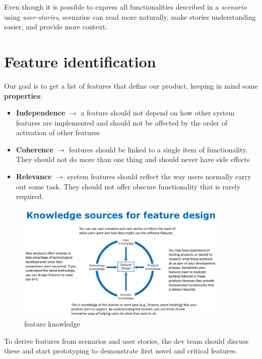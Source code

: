 Even though it is possible to express all functionalities described in a \textit{scenario} using \textit{user-stories},
scenarios can read more naturally, make stories understanding easier, and provide more context.

\section{Feature identification}
Our goal is to get a list of features that define our product, keeping in mind some \textbf{properties}:
\begin{itemize}
    \item \textbf{Independence} $\rightarrow$ a feature should not depend on how other system features are implemented and should not be affected by the order of activation of other features
    \item \textbf{Coherence} $\rightarrow$ features should be linked to a single item of functionality.
    They should not do more than one thing and should never have side effects
    \item \textbf{Relevance} $\rightarrow$ system features should reflect the way users normally carry out some task.
    They should not offer obscure functionality that is rarely required.
\end{itemize}

\begin{figure}
    \centering
    \includegraphics[width=0.9\textwidth]{images/feature_design.png}
    \caption{feature knowledge}
    \label{fig:feature_knowledge}
\end{figure}

To derive features from scenarios and user stories, the dev team should discuss these and start prototyping to demonstrate first novel and critical features.

